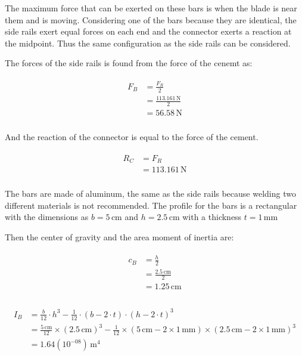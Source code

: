 \documentclass{article}
\begin{document}
The maximum force that can be exerted on these bars is when the blade is near them and is
moving. Considering one of the bars because they are identical, the side rails exert equal forces on each end and the connector exerts a reaction at the midpoint. Thus the same
configuration as the side rails can be considered.

The forces of the side rails is found from the force of the cenemt as:

\begin{align}
\begin{split}
F_{B}	&= \frac{F_{R}}{2}\\
		&= \frac{113.161\,\mathrm{N}}{2}\\
		&= 56.58\,\mathrm{N}\\
\end{split}
\end{align}

And the reaction of the connector is equal to the force of the cement.

\begin{align}
\begin{split}
R_{C}	&= F_{R}\\
		&= 113.161\,\mathrm{N}\\
\end{split}
\end{align}

The bars are made of aluminum, the same as the side rails because welding two different
materials is not recommended. The profile for the bars is a rectangular with the dimensions as $b = 5\,\mathrm{cm}$ and $h = 2.5\,\mathrm{cm}$ with a thickness $t = 1\,\mathrm{mm}$

Then the center of gravity and the area moment of inertia are:

\begin{align}
\begin{split}
c_{B}	&= \frac{h}{2}\\
		&= \frac{2.5\,\mathrm{cm}}{2}\\
		&= 1.25\,\mathrm{cm}\\
\end{split}
\end{align}

\begin{align}
\begin{split}
I_{B}	&= \frac{b}{12} \cdot h^{3} - \frac{1}{12} \cdot \left(b - 2 \cdot t\right) \cdot \left(h - 2 \cdot t\right)^{3}\\
		&= \frac{5\,\mathrm{cm}}{12} \times \left(2.5\,\mathrm{cm}\right)^{3} - \frac{1}{12} \times \left(5\,\mathrm{cm} - 2 \times 1\,\mathrm{mm}\right) \times \left(2.5\,\mathrm{cm} - 2 \times 1\,\mathrm{mm}\right)^{3}\\
		&= 1.64(10^{-08})\,\mathrm{m^{4}}\\
\end{split}
\end{align}
\end{document}
